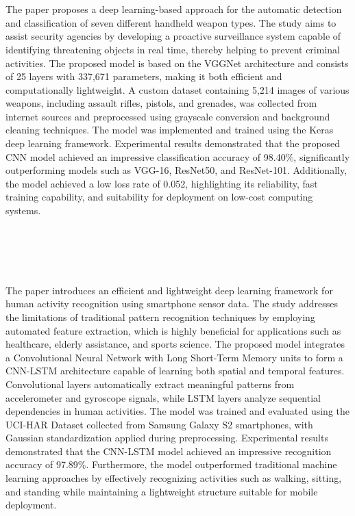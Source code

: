 \section[\LitTitleNine]{\LitTitleNine~\textbf{\cite{supplementary_paper_9}} \label{sec:supplementary_paper_9}}
The paper proposes a deep learning-based approach for the automatic detection and classification of seven different handheld weapon types. The study aims to assist security agencies by developing a proactive surveillance system capable of identifying threatening objects in real time, thereby helping to prevent criminal activities. The proposed model is based on the VGGNet architecture and consists of 25 layers with 337,671 parameters, making it both efficient and computationally lightweight. A custom dataset containing 5,214 images of various weapons, including assault rifles, pistols, and grenades, was collected from internet sources and preprocessed using grayscale conversion and background cleaning techniques. The model was implemented and trained using the Keras deep learning framework. Experimental results demonstrated that the proposed CNN model achieved an impressive classification accuracy of 98.40\%, significantly outperforming models such as VGG-16, ResNet50, and ResNet-101. Additionally, the model achieved a low loss rate of 0.052, highlighting its reliability, fast training capability, and suitability for deployment on low-cost computing systems.\label{end:supplementary_paper_9} \\

\section[\LitTitleTen]{\LitTitleTen~\textbf{\cite{supplementary_paper_10}} \label{sec:supplementary_paper_10}}
The paper introduces an efficient and lightweight deep learning framework for human activity recognition using smartphone sensor data. The study addresses the limitations of traditional pattern recognition techniques by employing automated feature extraction, which is highly beneficial for applications such as healthcare, elderly assistance, and sports science. The proposed model integrates a Convolutional Neural Network with Long Short-Term Memory units to form a CNN-LSTM architecture capable of learning both spatial and temporal features. Convolutional layers automatically extract meaningful patterns from accelerometer and gyroscope signals, while LSTM layers analyze sequential dependencies in human activities. The model was trained and evaluated using the UCI-HAR Dataset collected from Samsung Galaxy S2 smartphones, with Gaussian standardization applied during preprocessing. Experimental results demonstrated that the CNN-LSTM model achieved an impressive recognition accuracy of 97.89\%. Furthermore, the model outperformed traditional machine learning approaches by effectively recognizing activities such as walking, sitting, and standing while maintaining a lightweight structure suitable for mobile deployment.\label{end:supplementary_paper_10}

